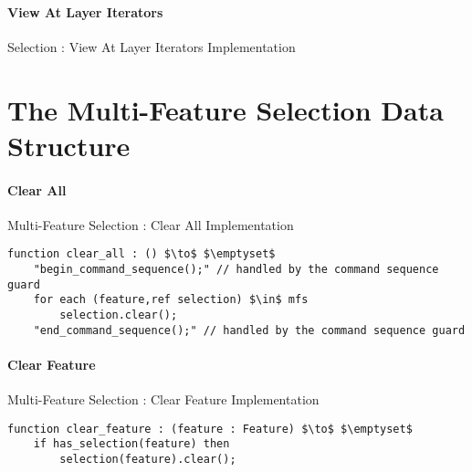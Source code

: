 \newpage

\paragraph{View At Layer Iterators}

\begin{stulisting}[H]
\caption{Selection : View At Layer Iterators Implementation}

\end{stulisting}

\newpage

\section{The Multi-Feature Selection Data Structure}

\paragraph{Clear All}

\begin{stulisting}[H]
\caption{Multi-Feature Selection : Clear All Implementation}
\begin{lstlisting}[style=Default]
function clear_all : () $\to$ $\emptyset$
	"begin_command_sequence();" // handled by the command sequence guard
	for each (feature,ref selection) $\in$ mfs
		selection.clear();
	"end_command_sequence();" // handled by the command sequence guard
\end{lstlisting}
\end{stulisting}

\paragraph{Clear Feature}

\begin{stulisting}[H]
\caption{Multi-Feature Selection : Clear Feature Implementation}
\begin{lstlisting}[style=Default]
function clear_feature : (feature : Feature) $\to$ $\emptyset$
	if has_selection(feature) then
		selection(feature).clear();
\end{lstlisting}
\end{stulisting}

